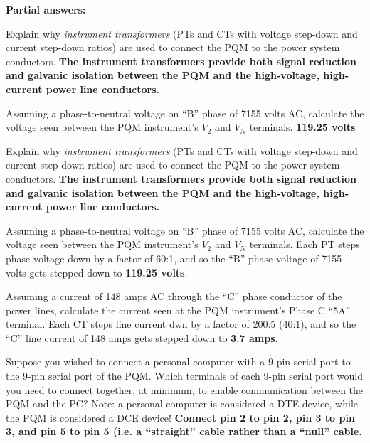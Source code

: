 





\noindent
{\bf Partial answers:}

\vskip 10pt

Explain why {\it instrument transformers} (PTs and CTs with voltage step-down and current step-down ratios) are used to connect the PQM to the power system conductors.  {\bf The instrument transformers provide both signal reduction and galvanic isolation between the PQM and the high-voltage, high-current power line conductors.}

\vskip 10pt

Assuming a phase-to-neutral voltage on ``B'' phase of 7155 volts AC, calculate the voltage seen between the PQM instrument's $V_2$ and $V_N$ terminals.  {\bf 119.25 volts}







Explain why {\it instrument transformers} (PTs and CTs with voltage step-down and current step-down ratios) are used to connect the PQM to the power system conductors.  {\bf The instrument transformers provide both signal reduction and galvanic isolation between the PQM and the high-voltage, high-current power line conductors.}

\vskip 10pt

Assuming a phase-to-neutral voltage on ``B'' phase of 7155 volts AC, calculate the voltage seen between the PQM instrument's $V_2$ and $V_N$ terminals.  Each PT steps phase voltage down by a factor of 60:1, and so the ``B'' phase voltage of 7155 volts gets stepped down to {\bf 119.25 volts}.

\vskip 10pt

Assuming a current of 148 amps AC through the ``C'' phase conductor of the power lines, calculate the current seen at the PQM instrument's Phase C ``5A'' terminal.  Each CT steps line current dwn by a factor of 200:5 (40:1), and so the ``C'' line current of 148 amps gets stepped down to {\bf 3.7 amps}.

\vskip 10pt

Suppose you wished to connect a personal computer with a 9-pin serial port to the 9-pin serial port of the PQM.  Which terminals of each 9-pin serial port would you need to connect together, at minimum, to enable communication between the PQM and the PC?  Note: a personal computer is considered a DTE device, while the PQM is considered a DCE device! {\bf Connect pin 2 to pin 2, pin 3 to pin 3, and pin 5 to pin 5 (i.e. a ``straight'' cable rather than a ``null'' cable.}


